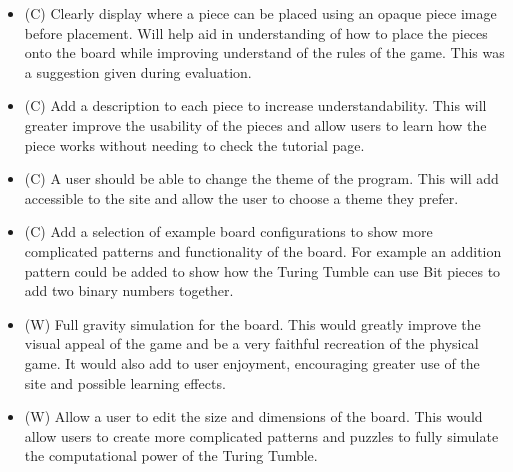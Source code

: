 \documentclass{l4proj}
\begin{document}
\begin{itemize}
    \item (C) Clearly display where a piece can be placed using an opaque piece image before placement. Will help aid in understanding of how to place the pieces onto the board while improving understand of the rules of the game. This was a suggestion given during evaluation.
    \item (C) Add a description to each piece to increase understandability. This will greater improve the usability of the pieces and allow users to learn how the piece works without needing to check the tutorial page.
    \item (C) A user should be able to change the theme of the program. This will add accessible to the site and allow the user to choose a theme they prefer.
    \item (C) Add a selection of example board configurations to show more complicated patterns and functionality of the board. For example an addition pattern could be added to show how the Turing Tumble can use Bit pieces to add two binary numbers together.
    \item (W) Full gravity simulation for the board. This would greatly improve the visual appeal of the game and be a very faithful recreation of the physical game. It would also add to user enjoyment, encouraging greater use of the site and possible learning effects.
    \item (W) Allow a user to edit the size and dimensions of the board. This would allow users to create more complicated patterns and puzzles to fully simulate the computational power of the Turing Tumble.
\end{itemize}
\end{document}
